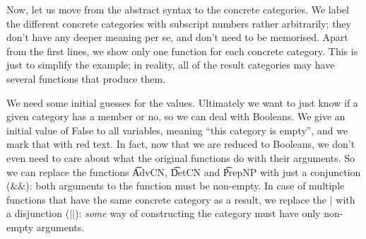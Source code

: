 Now, let us move from the \gf{} abstract syntax to the \pmcfg{} concrete
categories. We label the different concrete categories with
subscript numbers rather arbitrarily; they don't have any deeper
meaning per se, and don't need to be memorised. Apart from the first
lines, we show only one function for each concrete category. This is
just to simplify the example; in reality, all of the result categories
may have several functions that produce them.

\begin{EmptyItem}
\begin{HighlightingFancy}[]
\OtherTok{::=}    \FunctionTok{|}    \NormalTok{;}
\OtherTok{::=}   \FunctionTok{|}  \NormalTok{;}
\OtherTok{::=}    \NormalTok{;}
\OtherTok{::=}    \NormalTok{;}
\OtherTok{::=}    \NormalTok{;}
\OtherTok{::=}  \NormalTok{;}
\OtherTok{::=}  \NormalTok{;}
\OtherTok{::=}  \NormalTok{;}
\end{HighlightingFancy}
\end{EmptyItem}



We need some initial guesses for the values. Ultimately we want to
just know if a given category has a member or no, so we can deal with
Booleans. We give an initial value of False to all variables, meaning
``this category is empty'', and we mark that with red text.
In fact, now that we are reduced to Booleans, we don’t even need to
care about what the original \gf{} functions do with their arguments. So
we can replace the \gf{} functions \t{AdvCN}, \t{DetCN} and \t{PrepNP}
with just a conjunction ($\&\&$): both arguments to the function must
be non-empty. In case of multiple functions that have the same
concrete category as a result, we replace the $|$ with a disjunction
($||$): \emph{some} way of constructing the category must have only
non-empty arguments.

